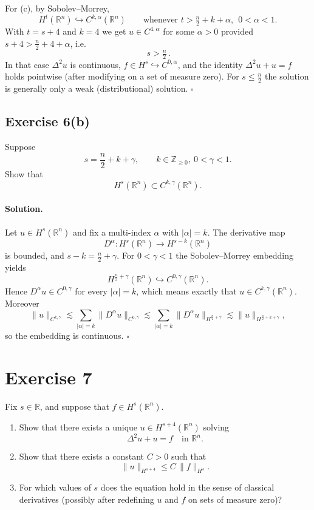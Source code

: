 \documentclass[12pt,a4paper]{article}
\newcommand{\qed}{\hfill$\square$}
\theoremstyle{plain}
\theoremstyle{definition}
\theoremstyle{remark}
\theoremstyle{remark}
\begin{document}
\medskip
For (c), by Sobolev–Morrey,
\[
H^{t}(\mathbb R^n)\hookrightarrow C^{k,\alpha}(\mathbb R^n)\qquad\text{whenever }t>\tfrac n2+k+\alpha,\ \ 0<\alpha<1.
\]
With $t=s+4$ and $k=4$ we get $u\in C^{4,\alpha}$ for some $\alpha>0$ provided $s+4>\frac n2+4+\alpha$, i.e.
\[
\boxed{\,s>\tfrac n2\,}.
\]
In that case $\Delta^2 u$ is continuous, $f\in H^s\hookrightarrow C^{0,\alpha}$, and the identity
$\Delta^2 u+u=f$ holds pointwise (after modifying on a set of measure zero).
For $s\le\tfrac n2$ the solution is generally only a weak (distributional) solution.
\qed


\subsection*{Exercise 6(b)}
Suppose
\[
s = \frac n2 + k + \gamma, \qquad k\in\mathbb Z_{\ge 0},\ 0<\gamma<1.
\]
Show that
\[
H^s(\mathbb R^n) \subset C^{k,\gamma}(\mathbb R^n).
\]

\paragraph{Solution.}
Let $u\in H^s(\mathbb R^n)$ and fix a multi-index $\alpha$ with $|\alpha|=k$.
The derivative map
\[
D^\alpha : H^s(\mathbb R^n)\longrightarrow H^{s-k}(\mathbb R^n)
\]
is bounded, and $s-k=\frac n2+\gamma$.
For $0<\gamma<1$ the Sobolev--Morrey embedding yields
\[
H^{\frac n2+\gamma}(\mathbb R^n)\hookrightarrow C^{0,\gamma}(\mathbb R^n).
\]
Hence $D^\alpha u\in C^{0,\gamma}$ for every $|\alpha|=k$, which means exactly that
$u\in C^{k,\gamma}(\mathbb R^n)$. Moreover
\[
\|u\|_{C^{k,\gamma}}
\lesssim \sum_{|\alpha|=k} \|D^\alpha u\|_{C^{0,\gamma}}
\lesssim \sum_{|\alpha|=k} \|D^\alpha u\|_{H^{\frac n2+\gamma}}
\lesssim \|u\|_{H^{\frac n2+k+\gamma}},
\]
so the embedding is continuous.
\qed

\bigskip
\bigskip

\section*{Exercise 7}
Fix $s\in\mathbb R$, and suppose that $f\in H^s(\mathbb R^n)$.
\begin{enumerate}
	\item[(a)] Show that there exists a unique $u\in H^{s+4}(\mathbb R^n)$ solving
	\[
	\Delta^2 u + u = f \quad\text{in }\mathbb R^n.
	\]
	\item[(b)] Show that there exists a constant $C>0$ such that
	\[
	\|u\|_{H^{s+4}} \le C\,\|f\|_{H^s}.
	\]
	\item[(c)] For which values of $s$ does the equation hold in the sense of classical derivatives
	(possibly after redefining $u$ and $f$ on sets of measure zero)?
\end{enumerate}
\end{document}
